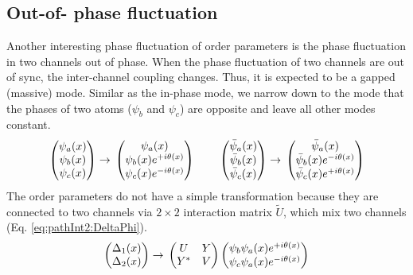 \subsection{Out-of- phase fluctuation}
Another interesting phase fluctuation of order parameters is the  phase fluctuation in two channels out of phase.   When  the phase fluctuation of two channels are out of  sync,  the inter-channel coupling changes.  Thus, it is  expected to be  a gapped (massive) mode.  Similar as the in-phase mode,  we narrow down to the mode that the phases of two atoms  ($\psi_{b}$ and $\psi_{c}$) are opposite and leave all other modes constant.  
\begin{equation*}
\begin{pmatrix}\psi_{a}(x)\\\psi_{b}(x)\\\psi_{c}(x)\end{pmatrix}\rightarrow{}
	\begin{pmatrix}\psi_{a}(x)\\\psi_{b}(x)e^{+i\theta(x)}\\\psi_{c}(x)e^{-i\theta(x)}\end{pmatrix}
\qquad{}
\begin{pmatrix}\bar\psi_{a}(x)\\\bar\psi_{b}(x)\\\bar\psi_{c}(x)\end{pmatrix}\rightarrow{}
	\begin{pmatrix}\bar\psi_{a}(x)\\\bar\psi_{b}(x)e^{-i\theta(x)}\\\bar\psi_{c}(x)e^{+i\theta(x)}\end{pmatrix}
\end{equation*}
The order parameters do not have a simple transformation because they are connected to two channels via $2\times2$ interaction matrix $\tilde{U}$, which mix two channels (Eq. \ref{eq:pathInt2:DeltaPhi}).  
\begin{equation*}
\begin{pmatrix}\Delta_{1}(x)\\\Delta_{2}(x)\end{pmatrix}\rightarrow{}
	\begin{pmatrix}U&Y\\Y^{*}&V\end{pmatrix}\begin{pmatrix}\psi_{b}\psi_{a}(x)e^{+i\theta(x)}\\\psi_{c}\psi_{a}(x)e^{-i\theta(x)}\end{pmatrix}
\end{equation*}
